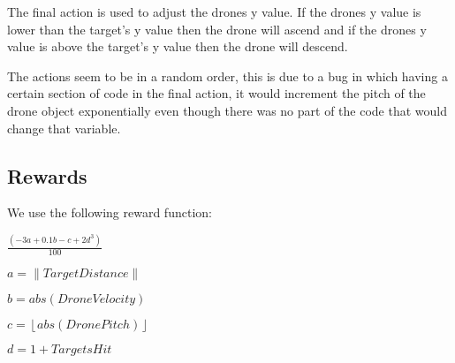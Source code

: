 The final action is used to adjust the drones y value. If the drones y value is lower than the target's y value then the drone will ascend and if the drones y value is above the target's y value then the drone will descend. 

The actions seem to be in a random order, this is due to a bug in which having a certain section of code in the final action, it would increment the pitch of the drone object exponentially even though there was no part of the code that would change that variable.

\subsection{Rewards}
We use the following reward function:


$\frac{(-3a+0.1b-c+2d^3)}{100}$

$a=\left \| Target Distance \right \|$

$b=abs(Drone Velocity)$

$c= \left \lfloor abs(DronePitch)  \right \rfloor $

$d=1+TargetsHit$

